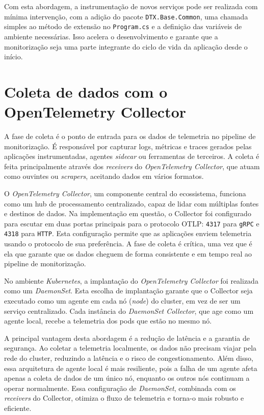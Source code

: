 Com esta abordagem, a instrumentação de novos serviços pode ser realizada com mínima intervenção, com a adição do pacote \texttt{DTX.Base.Common}, uma chamada simples ao método de extensão no \texttt{Program.cs} e a definição das variáveis de ambiente necessárias. Isso acelera o desenvolvimento e garante que a monitorização seja uma parte integrante do ciclo de vida da aplicação desde o início.


\section{Coleta de dados com o OpenTelemetry Collector}

A fase de coleta é o ponto de entrada para os dados de telemetria no pipeline de monitorização. É responsável por capturar logs, métricas e traces gerados pelas aplicações instrumentadas, agentes \textit{sidecar} ou ferramentas de terceiros. A coleta é feita principalmente através dos \textit{receivers} do \textit{OpenTelemetry Collector}, que atuam como ouvintes ou \textit{scrapers}, aceitando dados em vários formatos.

O \textit{OpenTelemetry Collector}, um componente central do ecossistema, funciona como um hub de processamento centralizado, capaz de lidar com múltiplas fontes e destinos de dados. Na implementação em questão, o Collector foi configurado para escutar em duas portas principais para o protocolo OTLP: \texttt{4317} para \texttt{gRPC} e \texttt{4318} para \texttt{HTTP}. Esta configuração permite que as aplicações enviem telemetria usando o protocolo de sua preferência. A fase de coleta é crítica, uma vez que é ela que garante que os dados cheguem de forma consistente e em tempo real ao pipeline de monitorização.

No ambiente \textit{Kubernetes}, a implantação do \textit{OpenTelemetry Collector} foi realizada como um \textit{DaemonSet}. Esta escolha de implantação garante que o Collector seja executado como um agente em cada nó (\textit{node}) do cluster, em vez de ser um serviço centralizado. Cada instância do \textit{DaemonSet Collector}, que age como um agente local, recebe a telemetria dos pods que estão no mesmo nó.

A principal vantagem desta abordagem é a redução de latência e a garantia de segurança. Ao coletar a telemetria localmente, os dados não precisam viajar pela rede do cluster, reduzindo a latência e o risco de congestionamento. Além disso, essa arquitetura de agente local é mais resiliente, pois a falha de um agente afeta apenas a coleta de dados de um único nó, enquanto os outros nós continuam a operar normalmente. Essa configuração de \textit{DaemonSet}, combinada com os \textit{receivers} do Collector, otimiza o fluxo de telemetria e torna-o mais robusto e eficiente.

